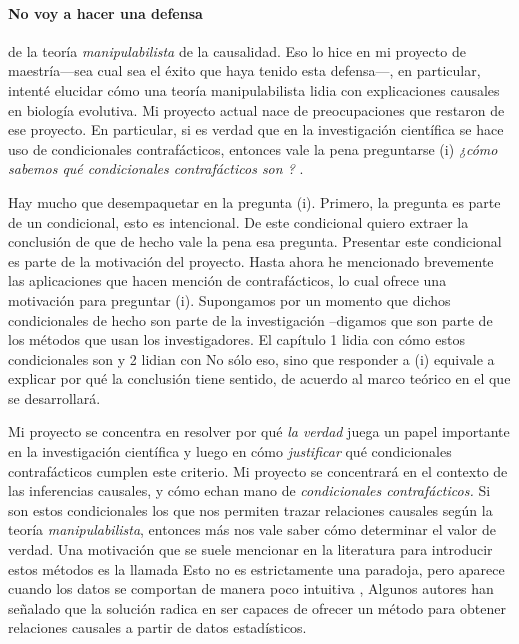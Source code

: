 \paragraph{No voy a hacer una defensa} de la teoría \emph{manipulabilista} de la causalidad. Eso lo hice en
mi proyecto de maestría---sea cual sea el éxito que haya tenido esta
defensa---, en particular, intenté elucidar cómo una teoría
manipulabilista lidia con explicaciones causales en biología
evolutiva. Mi proyecto actual nace de preocupaciones que restaron de
ese proyecto. En particular, si es verdad que en la investigación
científica se hace uso de condicionales contrafácticos, entonces vale
la pena preguntarse (i) \emph{¿cómo sabemos qué condicionales
	contrafácticos son ? }.

Hay mucho que desempaquetar en la pregunta (i). Primero, la pregunta
es parte de un condicional, esto es intencional. De este condicional
quiero extraer la conclusión de que de hecho vale la pena esa
pregunta. Presentar este condicional es parte de la motivación del
proyecto. Hasta ahora he mencionado brevemente las aplicaciones que
hacen mención de contrafácticos, lo cual ofrece una motivación para
preguntar (i). Supongamos por un momento que dichos condicionales de
hecho son parte de la investigación --digamos que son parte de los
métodos que usan los investigadores. El capítulo 1 lidia con cómo
estos condicionales son y 2 lidian con No sólo eso, sino que
responder a (i) equivale a explicar por qué la conclusión tiene
sentido, de acuerdo al marco teórico en el que se desarrollará.

Mi proyecto se concentra en resolver por qué \emph{la verdad} juega
un papel importante en la investigación científica y luego en cómo
\emph{justificar} qué condicionales contrafácticos cumplen este
criterio. Mi proyecto se concentrará en el contexto de las
inferencias causales, y cómo echan mano de \emph{condicionales
	contrafácticos.} Si son estos condicionales los que nos permiten
trazar relaciones causales según la teoría \emph{manipulabilista},
entonces más nos vale saber cómo determinar el valor de verdad. Una
motivación que se suele mencionar en la literatura para introducir
estos métodos es la llamada  Esto no es
estrictamente una paradoja, pero aparece cuando los datos se
comportan de manera poco intuitiva
\parencite[p.~13]{Hajek2016-HAJOHO}, Algunos autores han señalado que
la solución radica en ser capaces de ofrecer un método para obtener
relaciones causales a partir de datos estadísticos.

